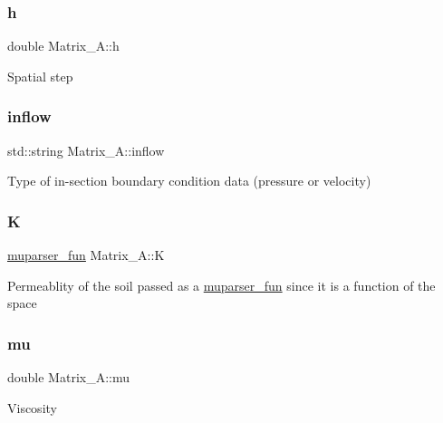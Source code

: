 \subsubsection{\texorpdfstring{h}{h}}
{\footnotesize\ttfamily double Matrix\+\_\+\+A\+::h\hspace{0.3cm}{\ttfamily [private]}}

Spatial step \mbox{\label{classMatrix__A_a2b717d20be2d9f93f0af603dab158d78}} 
\subsubsection{\texorpdfstring{inflow}{inflow}}
{\footnotesize\ttfamily std\+::string Matrix\+\_\+\+A\+::inflow\hspace{0.3cm}{\ttfamily [private]}}

Type of in-\/section boundary condition data (pressure or velocity) \mbox{\label{classMatrix__A_a4f7176023bc64fb41168ae596d50f28d}} 
\subsubsection{\texorpdfstring{K}{K}}
{\footnotesize\ttfamily \hyperlink{classmuparser__fun}{muparser\+\_\+fun} Matrix\+\_\+\+A\+::K\hspace{0.3cm}{\ttfamily [private]}}

Permeablity of the soil passed as a \hyperlink{classmuparser__fun}{muparser\+\_\+fun} since it is a function of the space \mbox{\label{classMatrix__A_a26bdcd4e2243970aa1b25ae6a6cb1cb3}} 
\subsubsection{\texorpdfstring{mu}{mu}}
{\footnotesize\ttfamily double Matrix\+\_\+\+A\+::mu\hspace{0.3cm}{\ttfamily [private]}}

Viscosity \mbox{\label{classMatrix__A_a66d9e3023a933b7622aedd449821b8fb}} 
